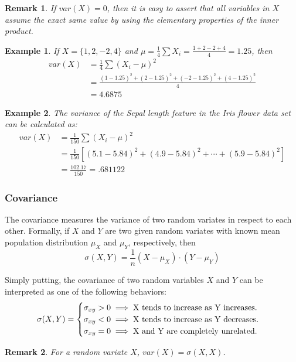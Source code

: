 \documentclass[12pt]{article}
\newtheorem{remark}{Remark}[section]
\newtheorem{example}{Example}[section]
\begin{document}
\begin{remark}
	If $var(X) = 0$, then it is easy to assert that all variables in $X$ assume the exact same value by using the elementary properties of the inner product.
\end{remark}

\begin{example}
	If $X=\{1, 2, -2, 4\}$ and $\mu = \frac{1}{4} \sum X_i = \frac{1+2-2+4}{4} = 1.25$, then
	\begin{align*}
	var(X) &= \frac{1}{4} \sum (X_i - \mu)^2 \\
	&= \frac{(1-1.25)^2 + (2-1.25)^2 + (-2-1.25)^2 + (4-1.25)^2}{4} \\
	&= 4.6875
	\end{align*}
\end{example}

\begin{example}
	The variance of the Sepal length feature in the Iris flower data set can be calculated as:
	\begin{align*}
	var(X) &= \frac{1}{150} \sum (X_i - \mu)^2 \\
	&= \frac{1}{150} [(5.1-5.84)^2 + (4.9-5.84)^2 + \cdots + (5.9-5.84)^2] \\
	&= \frac{102.17}{150} = .681122
	\end{align*}
\end{example}

\subsubsection{Covariance}

The covariance measures the variance of two random variates in respect to each other. Formally, if $X$ and $Y$ are two given random variates with known mean population distribution $\mu_X$ and $\mu_Y$, respectively, then
$$\sigma(X, Y) = \frac{1}{n} (X - \mu_X) \cdot (Y - \mu_Y) $$

Simply putting, the covariance of two random variables $X$ and $Y$ can be interpreted as one of the following behaviors:
$$
\sigma(X,Y) = \begin{cases}
\sigma_{xy} > 0 \implies \textnormal{X tends to increase as Y increases.}\\
\sigma_{xy} < 0 \implies \textnormal{X tends to increase as Y decreases.}\\
\sigma_{xy} = 0 \implies \textnormal{X and Y are completely unrelated.}
\end{cases}
$$

\begin{remark}
	For a random variate $X$, $var(X) = \sigma(X, X)$.
\end{remark}
\end{document}
